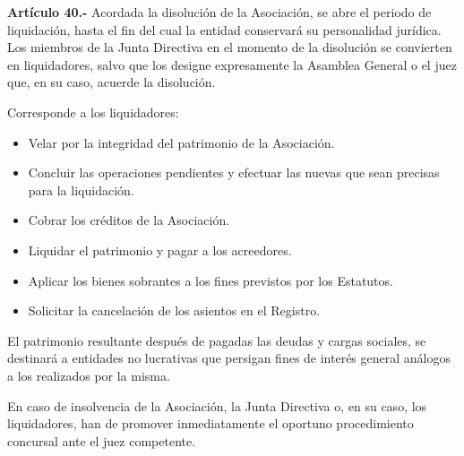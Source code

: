\documentclass[a4paper,12pt]{article}
\begin{document}
\begin{onehalfspace}
\bigskip\bigskip

\textbf{Art\'iculo 40.-} Acordada la disoluci\'on de la Asociaci\'on, se abre el periodo de liquidaci\'on, hasta el fin del cual la entidad conservar\'a su personalidad jur\'idica. Los miembros de la Junta Directiva en el momento de la disoluci\'on se convierten en liquidadores, salvo que los designe expresamente la Asamblea General o el juez que, en su caso, acuerde la disoluci\'on.

Corresponde a los liquidadores:
\begin{itemize}
\item [a)] Velar por la integridad del patrimonio de la Asociaci\'on.
\item [b)] Concluir las operaciones pendientes y efectuar las nuevas que sean precisas para la liquidaci\'on.
\item [c)] Cobrar los cr\'editos de la Asociaci\'on.
\item [d)] Liquidar el patrimonio y pagar a los acreedores.
\item [e)] Aplicar los bienes sobrantes a los fines previstos por los Estatutos.
\item [f)] Solicitar la cancelaci\'on de los asientos en el Registro.
\end{itemize}

El patrimonio resultante despu\'es de pagadas las deudas y cargas sociales, se destinar\'a a entidades no lucrativas que persigan fines de inter\'es general an\'alogos a los realizados por la misma.

En caso de insolvencia de la Asociaci\'on, la Junta Directiva o, en su caso, los liquidadores, han de promover inmediatamente el oportuno procedimiento concursal ante el juez competente.

\end{onehalfspace}
\end{document}
